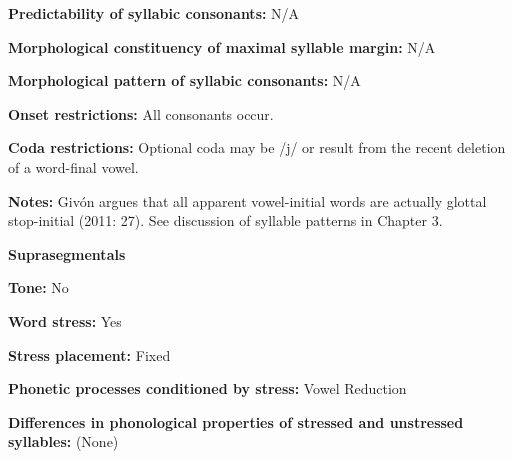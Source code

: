 \begin{styleBody}
\textbf{Predictability of syllabic consonants:} N/A
\end{styleBody}

\begin{styleBody}
\textbf{Morphological constituency of maximal syllable margin:} N/A
\end{styleBody}

\begin{styleBody}
\textbf{Morphological pattern of syllabic consonants:} N/A
\end{styleBody}

\begin{styleBody}
\textbf{Onset restrictions:} All consonants occur.
\end{styleBody}

\begin{styleBody}
\textbf{Coda restrictions: }Optional coda may be /j/ or result from the recent deletion of a word-final vowel. 
\end{styleBody}

\begin{styleBody}
\textbf{Notes: }Givón argues that all apparent vowel-initial words are actually glottal stop-initial (2011: 27). See discussion of syllable patterns in Chapter 3.
\end{styleBody}

\begin{styleBody}
\textbf{Suprasegmentals}
\end{styleBody}

\begin{styleBody}
\textbf{Tone: }No
\end{styleBody}

\begin{styleBody}
\textbf{Word stress:} Yes
\end{styleBody}

\begin{styleBody}
\textbf{Stress placement:} Fixed
\end{styleBody}

\begin{styleBody}
\textbf{Phonetic processes conditioned by stress:} Vowel Reduction
\end{styleBody}

\begin{styleBody}
\textbf{Differences in phonological properties of stressed and unstressed syllables:} (None)
\end{styleBody}

